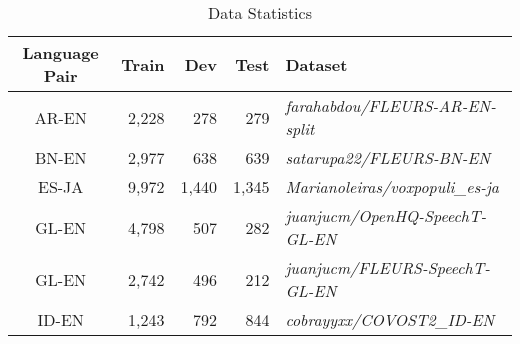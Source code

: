 \begin{table*}[ht]
\centering
\begin{tabular}{@{}crrrl@{}}
\toprule
\textbf{Language Pair} & \textbf{Train} & \textbf{Dev} & \textbf{Test} & \textbf{Dataset}                                \\ \midrule
AR-EN                  & 2,228          & 278          & 279           & \textit{\small farahabdou/FLEURS-AR-EN-split}                   \\
BN-EN                  & 2,977          & 638          & 639           & \textit{\small satarupa22/FLEURS-BN-EN}                         \\
ES-JA                  & 9,972          & 1,440        & 1,345         & \textit{\small Marianoleiras/voxpopuli\_es-ja}                  \\
GL-EN                  & 4,798          & 507          & 282           & \textit{\small juanjucm/OpenHQ-SpeechT-GL-EN}                   \\
GL-EN                  & 2,742          & 496          & 212           & \textit{\small juanjucm/FLEURS-SpeechT-GL-EN}                   \\
ID-EN                  & 1,243          & 792          & 844           & \textit{\small cobrayyxx/COVOST2\_ID-EN} \\ \bottomrule
\end{tabular}
\caption{Data Statistics}
\label{tab:data}
\end{table*}